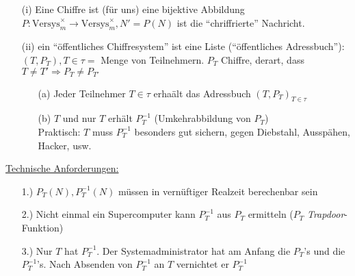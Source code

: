\documentclass[a4paper,DIV15,BCOR12mm]{article}
\begin{document}
\begin{definition}
    \begin{itemize}
        \item[(i)] Eine Chiffre ist (für uns) eine bijektive Abbildung $P: \text{Versys}_m^\times \to \text{Versys}_m^\times, N' = P(N)$ ist die "`chriffrierte"' Nachricht.
        \item[(ii)] ein "`öffentliches Chiffresystem"' ist eine Liste ("`öffentliches Adressbuch"'):\\
            $(T, P_T), T \in \tau =$ Menge von Teilnehmern. $P_T$ Chiffre, derart, dass $T \not= T' \Rightarrow P_T \not= P_{T'}$
            \begin{itemize}
                \item[(a)] Jeder Teilnehmer $T \in \tau$ erhaält das Adressbuch $(T, P_T)_{T \in \tau}$
                \item[(b)] $T$ und nur $T$ erhält $P_T^{-1}$ (Umkehrabbildung von $P_T$)\\
                    Praktisch: $T$ muss $P_T^{-1}$ besonders gut sichern, gegen Diebstahl, Ausspähen, Hacker, usw.
            \end{itemize}   \end{itemize}
\end{definition}

\underline{Technische Anforderungen:}\\
\begin{itemize}
    \item[1.)] $P_T(N), P_T^{-1}(N)$ müssen in vernüftiger Realzeit berechenbar sein
    \item[2.)] Nicht einmal ein Supercomputer kann $P_T^{-1}$ aus $P_T$ ermitteln ($P_T$ \emph{Trapdoor}-Funktion)
    \item[3.)] Nur $T$ hat $P_T^{-1}$. Der Systemadministrator hat am Anfang die $P_T$'s und die $P_T^{-1}$'s. Nach Absenden von $P_T^{-1}$ an $T$ vernichtet er $P_T^{-1}$
\end{itemize}
\end{document}
